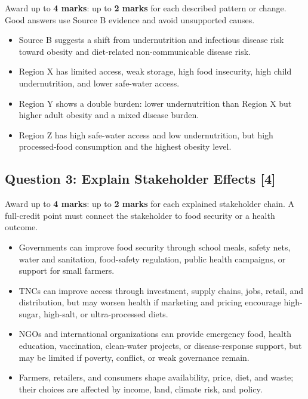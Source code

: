 \documentclass[11pt,a4paper]{article}
\newcommand{\term}[1]{\textcolor{HeadingBlue}{\textbf{#1}}}
\begin{document}
Award up to \term{4 marks}: up to \term{2 marks} for each described pattern or
change. Good answers use Source B evidence and avoid unsupported causes.

\begin{itemize}
  \item Source B suggests a shift from undernutrition and infectious disease
  risk toward obesity and diet-related non-communicable disease risk.
  \item Region X has limited access, weak storage, high food insecurity, high
  child undernutrition, and lower safe-water access.
  \item Region Y shows a double burden: lower undernutrition than Region X but
  higher adult obesity and a mixed disease burden.
  \item Region Z has high safe-water access and low undernutrition, but high
  processed-food consumption and the highest obesity level.
\end{itemize}

\subsection{Question 3: Explain Stakeholder Effects [4]}

Award up to \term{4 marks}: up to \term{2 marks} for each explained stakeholder
chain. A full-credit point must connect the stakeholder to food security or a
health outcome.

\begin{itemize}
  \item Governments can improve food security through school meals, safety nets,
  water and sanitation, food-safety regulation, public health campaigns, or
  support for small farmers.
  \item TNCs can improve access through investment, supply chains, jobs, retail,
  and distribution, but may worsen health if marketing and pricing encourage
  high-sugar, high-salt, or ultra-processed diets.
  \item NGOs and international organizations can provide emergency food, health
  education, vaccination, clean-water projects, or disease-response support, but
  may be limited if poverty, conflict, or weak governance remain.
  \item Farmers, retailers, and consumers shape availability, price, diet, and
  waste; their choices are affected by income, land, climate risk, and policy.
\end{itemize}
\end{document}
